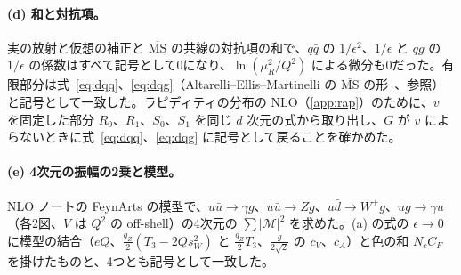 \documentclass[a4paper,10pt]{ltjsarticle}
\newcommand{\MSbar}{\overline{\mathrm{MS}}}
\begin{document}
\paragraph{(d) 和と対抗項。}実の放射と仮想の補正と $\MSbar$ の共線の対抗項の和で、$q\bar q$ の $1/\epsilon^2$、$1/\epsilon$ と $qg$ の $1/\epsilon$ の係数はすべて記号として0になり、$\ln(\mu_R^2/Q^2)$ による微分も0だった。有限部分は式~\eqref{eq:dqq}、\eqref{eq:dqg}（Altarelli--Ellis--Martinelli の $\MSbar$ の形~\cite{aem79}、参照）と記号として一致した。ラピディティの分布の NLO（\ref{app:rap}）のために、$v$ を固定した部分 $R_0$、$R_1$、$S_0$、$S_1$ を同じ $d$ 次元の式から取り出し、$G$ が $v$ によらないときに式~\eqref{eq:dqq}、\eqref{eq:dqg} に記号として戻ることを確かめた。

\paragraph{(e) 4次元の振幅の2乗と模型。}NLO ノートの FeynArts の模型で、$u\bar u\to\gamma g$、$u\bar u\to Zg$、$u\bar d\to W^+g$、$ug\to\gamma u$（各2図、$V$ は $Q^2$ の off-shell）の4次元の $\sum|\mathcal M|^2$ を求めた。(a) の式の $\epsilon\to0$ に模型の結合（$eQ$、$\frac{g_Z}2(T_3-2Qs_W^2)$ と $\frac{g_Z}2T_3$、$\frac g{2\sqrt2}$ の $c_V$、$c_A$）と色の和 $N_cC_F$ を掛けたものと、4つとも記号として一致した。
\end{document}
